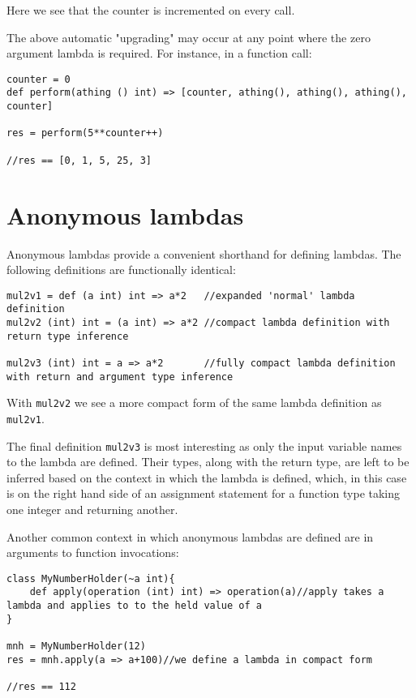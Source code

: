 \documentclass[conc-doc]{subfiles}
\begin{document}
Here we see that the counter is incremented on every call.

The above automatic "upgrading" may occur at any point where the zero argument lambda is required. For instance, in a function call:

\begin{lstlisting}
counter = 0
def perform(athing () int) => [counter, athing(), athing(), athing(), counter]

res = perform(5**counter++)

//res == [0, 1, 5, 25, 3]
\end{lstlisting}

\section{Anonymous lambdas}
Anonymous lambdas provide a convenient shorthand for defining lambdas. The following definitions are functionally identical:

\begin{lstlisting}
mul2v1 = def (a int) int => a*2   //expanded 'normal' lambda definition
mul2v2 (int) int = (a int) => a*2 //compact lambda definition with return type inference

mul2v3 (int) int = a => a*2       //fully compact lambda definition with return and argument type inference
\end{lstlisting}

With \lstinline{mul2v2} we see a more compact form of the same lambda definition as \lstinline{mul2v1}.

The final definition \lstinline{mul2v3} is most interesting as only the input variable names to the lambda are defined. Their types, along with the return type, are left to be inferred based on the context in which the lambda is defined, which, in this case is on the right hand side of an assignment statement for a function type taking one integer and returning another. 

Another common context in which anonymous lambdas are defined are in arguments to function invocations:
\begin{lstlisting}
class MyNumberHolder(~a int){
	def apply(operation (int) int) => operation(a)//apply takes a lambda and applies to to the held value of a
}

mnh = MyNumberHolder(12)
res = mnh.apply(a => a+100)//we define a lambda in compact form

//res == 112
\end{lstlisting}
\end{document}
